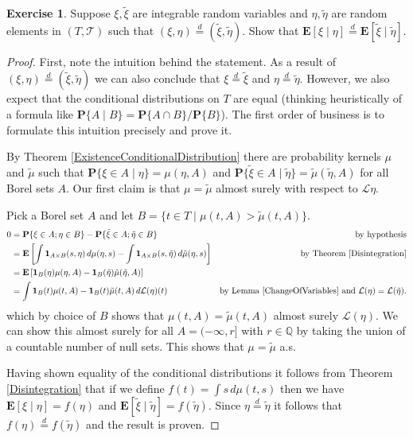 \documentclass{amsbook}
\theoremstyle{definition}
\newtheorem{xca}{Exercise}
\theoremstyle{remark}
\newcommand{\expectation}[1]{\textbf{E}\left[#1\right]}
\newcommand{\cexpectationlong}[2]{\textbf{E}\left[ #2 \mid #1 \right]}
\newcommand{\probability}[1]{\textbf{P}\{#1\}}
\newcommand{\cprobability}[2]{\textbf{P}\{#2 \mid #1\}}
\newcommand{\characteristic}[1]{\textbf{1}_{#1}}
\newcommand{\rationals}{\mathbb{Q}}
\newcommand{\eqdist}{\overset{d}=}
\begin{document}
\begin{xca}Suppose $\xi, \tilde{\xi}$ are integrable random variables
  and $\eta, \tilde{\eta}$ are random elements in $(T, \mathcal{T})$
  such that $(\xi,\eta) \eqdist (\tilde{\xi}, \tilde{\eta})$.  Show
  that $\cexpectationlong{\eta}{\xi} \eqdist \cexpectationlong{\tilde{\eta}}{\tilde{\xi}}$.
\end{xca}
\begin{proof}
First, note the intuition behind the statement.  As a result of
$(\xi,\eta) \eqdist (\tilde{\xi}, \tilde{\eta})$ we can also conclude
that $\xi \eqdist \tilde{\xi}$ and $\eta \eqdist \tilde{\eta}$.
However, we also expect that the conditional distributions on $T$ are
equal (thinking heuristically of a formula like $\cprobability{B}{A} =
\probability{A \cap B} / \probability{B}$).  The first order of
business is to formulate this intuition precisely and prove it.

By Theorem \ref{ExistenceConditionalDistribution} there are
probability kernels $\mu$ and $\tilde{\mu}$ such that
$\cprobability{\eta}{\xi \in A} = \mu(\eta, A)$ and
$\cprobability{\tilde{\eta}}{\tilde{\xi} \in A} =
\tilde{\mu}(\tilde{\eta}, A)$ for all Borel sets $A$.  Our first claim
is that $\mu = \tilde{\mu}$ almost surely with respect to
$\mathcal{L}{\eta}$.

Pick a Borel set $A$ and let $B = \lbrace t \in T \mid \mu(t, A) >
\tilde{\mu}(t, A) \rbrace$. 
\begin{align*}
0 &= \probability{\xi \in A; \eta \in B} - \probability{\tilde{\xi}
  \in A; \tilde{\eta} \in B} & \text{by hypothesis}\\
&=\expectation{\int \characteristic{A \times B}(s, \eta) \,
  d\mu(\eta, s) - \int \characteristic{A \times B}(s, \tilde{\eta}) \,
  d\tilde{\mu}(\eta, s)} & \text{by Theorem \ref{Disintegration}}\\
&=\expectation{\characteristic{B}(\eta) \mu(\eta, A) -
  \characteristic{B}(\tilde{\eta}) \tilde{\mu}(\tilde{\eta}, A)} \\
&=\int \characteristic{B}(t) \mu(t, A) -
  \characteristic{B}(t) \tilde{\mu}(t, A) \, d\mathcal{L}(\eta)(t) &
  \text{by Lemma \ref{ChangeOfVariables} and $\mathcal{L}(\eta) = \mathcal{L}(\tilde{\eta})$.}
\end{align*}
which by choice of $B$ shows that $\mu(t, A) =\tilde{\mu}(t, A)$
almost surely $\mathcal{L}(\eta)$.  We can show this almost surely for all $A =
(-\infty, r]$ with $r \in \rationals$ by taking the union of a
countable number of null sets.  This shows that $\mu = \tilde{\mu}$
a.s.

Having shown equality of the conditional distributions it follows from
Theorem \ref{Disintegration} that if we define $f(t) = \int s \, d\mu(t,
s)$ then we have $\cexpectationlong{\eta}{\xi} = f(\eta)$ and
$\cexpectationlong{\tilde{\eta}}{\tilde{\xi}} = f(\tilde{\eta})$.
Since $\eta \eqdist \tilde{\eta}$ it follows that $f(\eta) \eqdist
f(\tilde{\eta})$ and the result is proven.
\end{proof}
\end{document}
